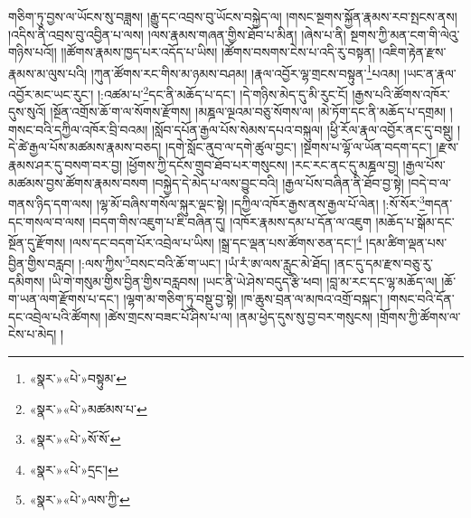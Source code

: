 གཅིག་ཏུ་བྱས་ལ་ཡོངས་སུ་བཟླས། །རྒྱུ་དང་འབྲས་བུ་ཡོངས་བསྐྱེད་ལ། །གསང་སྔགས་སྐྱོན་རྣམས་རབ་སྤངས་ནས། །འདིས་ནི་འབྲས་བུ་འབྱིན་པ་ལས། །ལས་རྣམས་གཞན་གྱིས་ཐོབ་པ་མིན། །ཞེས་པ་ནི། སྔགས་ཀྱི་མན་ངག་གི་ལེའུ་གཉིས་པའོ།། །།ཚོགས་རྣམས་ཁྱད་པར་འདོད་པ་ཡིས། །ཚོགས་བསགས་ངེས་པ་འདི་རུ་བསྟན། །འཇིག་རྟེན་རྫས་རྣམས་མ་ལུས་པའི། །ཀུན་ཚོགས་རང་གིས་མ་ཉམས་བཤམ། །རྣལ་འབྱོར་ལྷ་གྲངས་བསྟུན་\footnote{«སྣར་»«པེ་»བསྟུམ་}པའམ། །ཡང་ན་རྣལ་འབྱོར་མང་ཡང་རུང་། །:འཚམ་པ་\footnote{«སྣར་»«པེ་»མཚམས་པ་}དང་ནི་མཆོད་པ་དང་། །དེ་གཉིས་མེད་དུ་མི་རུང་ངོ། །རྒྱས་པའི་ཚོགས་འཁོར་དུས་སུའོ། །སྔོན་འགྲོས་ཆོ་ག་ལ་སོགས་རྫོགས། །མཎྜལ་ལྔའམ་བཅུ་སོགས་ལ། །མེ་ཏོག་དང་ནི་མཆོད་པ་དགྲམ། །གསང་བའི་དཀྱིལ་འཁོར་བྲི་བའམ། །སློབ་དཔོན་རྒྱལ་པོས་སེམས་དཔའ་བསྐུལ། །ཕྱི་རོལ་རྣལ་འབྱོར་ནང་དུ་བསྡུ། །དེ་ཚེ་རྒྱལ་པོས་མཚམས་རྣམས་བཅད། །དགེ་སློང་ནུབ་ལ་དགེ་ཚུལ་བྱང་། །སྔགས་པ་ལྷོ་ལ་ཡོན་བདག་དང་། །རྫས་རྣམས་ཤར་དུ་བསག་བར་བྱ། །ཕྱོགས་ཀྱི་དངོས་གྲུབ་ཐོབ་པར་གསུངས། །རང་རང་ནང་དུ་མཎྜལ་བྱ། །རྒྱལ་པོས་མཚམས་བྱས་ཚོགས་རྣམས་བསག །བསྐྱེད་དེ་མེད་པ་ལས་བྱུང་བའི། །རྒྱལ་པོས་བཞིན་ནི་ཐོབ་བྱ་སྟེ། །བདེ་བ་ལ་གནས་ཉིད་དག་ལས། །ལྷ་མོ་བཞིས་གསོལ་སྐུར་ལྡང་སྟེ། །དཀྱིལ་འཁོར་རྒྱས་ནས་རྒྱལ་པོ་ལེན། །:སོ་སོར་\footnote{«སྣར་»«པེ་»སོ་སོ་}གདན་དང་གསལ་བ་ལས། །བདག་གིས་འཇུག་པ་ཇི་བཞིན་དུ། །འཁོར་རྣམས་དམ་པ་དོན་ལ་འཇུག །མཆོད་པ་སྒོམ་དང་སྔོན་དུ་རྫོགས། །ལས་དང་བདག་པོར་འབྲེལ་པ་ཡིས། །སྒྲ་དང་ལྡན་པས་ཚོགས་ཅན་དང་།\footnote{«སྣར་»«པེ་»དྲང་།} །དམ་ཚིག་ལྡན་པས་བྱིན་གྱིས་བརླབ། །:ལས་ཀྱིས་\footnote{«སྣར་»«པེ་»ལས་ཀྱི་}བསང་བའི་ཆོ་ག་ཡང་། །ཡཾ་རཾ་ཨ་ལས་རླུང་མེ་ཐོད། །ནང་དུ་དམ་རྫས་བཅུ་རུ་དམིགས། །ཡི་གེ་གསུམ་གྱིས་བྱིན་གྱིས་བརླབས། །ཡང་ནི་ཡེ་ཤེས་བདུད་རྩི་ཕབ། །བླ་མ་རང་དང་ལྷ་མཆོད་ལ། །ཆོ་ག་ཡན་ལག་རྫོགས་པ་དང་། །ལྷག་མ་གཅིག་ཏུ་བསྡུ་བྱ་སྟེ། །ཁ་ཆུས་བྲན་ལ་མཁའ་འགྲོ་བསྐང་། །གསང་བའི་དོན་དང་འབྲེལ་པའི་ཚོགས། །ཚེས་གྲངས་བཟང་པོ་ཤིས་པ་ལ། །ནམ་ཕྱེད་དུས་སུ་བྱ་བར་གསུངས། །གྲོགས་ཀྱི་ཚོགས་ལ་ངེས་པ་མེད། །
